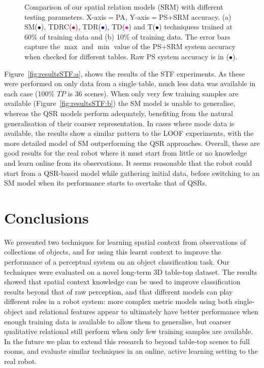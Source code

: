 \documentclass[letterpaper]{article}
\begin{document}
\begin{figure}[t]
\begin{center}
\quad
{}
\caption{Comparison of our spatial relation models (SRM) with different testing parameters. X-axis$=$PA, Y-axis$=$PS+SRM accuracy. (a) SM(\textcolor{OliveGreen}{\textbf{$\bullet$}}), TDRC(\textcolor{Red}{\textbf{$\bullet$}}), TDR(\textcolor{blue}{\textbf{$\bullet$}}), TD(\textcolor{Magenta}{\textbf{$\bullet$}}) and T(\textcolor{Sepia}{\textbf{$\bullet$}}) techniquess trained at 60\% of training data and (b) 10\% of training data. The error bars capture the $\max$ and $\min$ value of the PS+SRM system accuracy when checked for different tables. Raw PS system accuracy is in ({$\bullet$}).}

\label{fig:resultsSTF}
\end{center}
\end{figure}

Figure~\ref{fig:resultsSTF:a}, shows the results of the STF experiments. As these were performed  on only data from a single table, much less data was available in each case (100\% $TP$ is 36 scenes). When only very few training samples are available (Figure~\ref{fig:resultsSTF:b}) the SM model is unable to generalise, whereas the QSR models perform adequately, benefiting from the natural generalisation of their coarser representation. In cases where mode data is available, the results show a similar pattern to the LOOF experiments, with the more detailed model of SM outperforming the QSR approaches. Overall, these are good results for the real robot where it must start from little or no knowledge and learn online from its observations. It seems reasonable that the robot could start from a QSR-based model while gathering initial data, before switching to an SM model when its performance starts to overtake that of QSRs.

\section{Conclusions}
\label{sec:Conclusions}

We presented two techniques for learning spatial context from observations of collections of objects, and for using this learnt context to improve the performance of a perceptual system on an object classification task. Our techniques were evaluated on a novel long-term 3D table-top dataset. The results showed that spatial context knowledge can be used to improve classification results beyond that of raw perception, and that different models can play different roles in a robot system: more complex metric models using both single-object and relational features appear to ultimately have better performance when enough training data is available to allow them to generalise, but coarser qualitative relational still perform when only few training samples are available. In the future we plan to extend this research to beyond table-top scenes to full rooms, and evaluate similar techniques in an online, active learning setting to the real robot.
\end{document}
